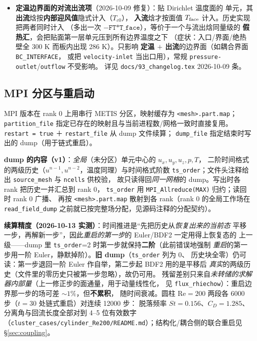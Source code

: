 \documentclass[11pt,a4paper]{ctexart}
\begin{document}
\begin{itemize}
        ``壁面到壁面''的几何量（如 H 与 0）。论文型算例（Betchen PLUG，
        \texttt{cases/betchen}）用它直接给出 $u(y)=6U_0y/H(1-y/H)$，
        省掉``均匀入口 + 长发展段''的做法；解析/数值验证见
        \texttt{cases/betchen/README.md} \S3.4。
  \item \textbf{定温边界面的对流出流项}（2026-10-09 修复）：贴 Dirichlet 温度面的
        单元，其\textbf{出流}焓按\textbf{内部迎风值}隐式计入（$T_{c0}$），
        \textbf{入流}焓才按面值 $T_{\rm face}$ 计入。历史实现把两者同时计入
        （多出一次 $-\texttt{FT*T\_face}$），等价于一个与流出焓同量级的
        \textbf{假热汇}，会把贴面第一层单元压到所有边界温度之下
        （症状：入口/界面/绝热壁全 300 K 而板内出现 286 K）。只影响
        \textbf{定温 $+$ 出流}的边界面（如耦合界面 \texttt{BC\_INTERFACE}，
        或把 \texttt{velocity-inlet} 当出口用），常规
        \texttt{pressure-outlet}/\texttt{outflow} 不受影响。
        详见 \texttt{docs/93\_changelog.tex} 2026-10-09 条。
\end{itemize}

\subsection{MPI 分区与重启动}

MPI 版本在 rank 0 上用串行 METIS 分区，映射缓存为 \texttt{<mesh>.part.map}；
\texttt{partition\_file} 指定已存在的映射且与当前进程数/网格一致时直接复用。
\texttt{restart = true} ＋ \texttt{restart\_file} 从 dump 文件续算；
\texttt{dump\_file} 指定结束时写出的 dump（用于链式重启）。

\textbf{dump 的内容（v1）}：\emph{全局}（未分区）单元中心的 $u_x,u_y,u_z,p,T$，
二阶时间格式的两级历史（$u^{n-1},u^{n-2}$，温度同理）与时间格式阶数
\texttt{ts\_order}；文件头注释给出 \texttt{source\_mesh} 与 \texttt{ncells} 供校验，
故只读得回\emph{同一网格}的 dump。写出时各 rank 把历史一并汇总到 rank 0，
\texttt{ts\_order} 用 \texttt{MPI\_Allreduce(MAX)} 归约；读回时 rank 0 广播、
再按 \texttt{<mesh>.part.map} 散射到各 rank（rank 0 的全局工作场在
\texttt{read\_field\_dump} 之前就已按完整场分配，见源码注释的分配契约）。

\textbf{续算精度（2026-10-13 实测）}：时间推进是``先把历史从\emph{恢复出来的当前态}
平移一步，再解新一步''，因此\emph{重启的第一步}的 Euler/BDF2 一定用得上恢复态的
上一级——dump 里 \texttt{ts\_order}=2 时第一步就保持\textbf{二阶}（此前错误地强制
\emph{重启}的第一步用一阶 Euler，静默掉阶）。\textbf{旧 dump}（\texttt{ts\_order} 列为 0、
历史块全零）仍可读：第一步退回一阶 Euler 作自举，第二步起 BDF2 用的是平移后
\emph{真实}的两级历史（文件里的零历史只被第一步忽略），故仍可用。
残留差别只来自\emph{未转储的求解器内部量}（上一修正步的面通量，用于动量线性化，
见 \texttt{flux\_rhiechow}）：重启边界那一步的场可差 $\sim1\%$，但\textbf{不累积}，
随时间衰减。圆柱 Re$=200$ 两段各 6000 步（$t=30$ 处链式重启）对连续 12000 步：
脱落频率 $St=0.156$、$C_D=1.285$、分离角与回流长度全部对到 4--5 位有效数字
（\texttt{cluster\_cases/cylinder\_Re200/README.md}）；结构化/耦合侧的联合重启见
\S\ref{sec:coupling}。
\end{document}

